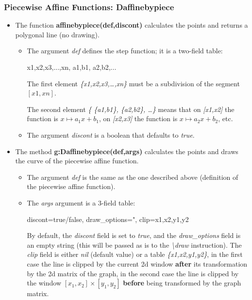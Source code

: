 \subsubsection{Piecewise Affine Functions: Daffinebypiece}

\begin{itemize}
    \item The function \textbf{affinebypiece(def,discont)} calculates the points and returns a polygonal line (no drawing).

\begin{itemize}
    \item The argument \emph{def} defines the step function; it is a two-field table:

\begin{TeXcode}
{ {x1,x2,x3,...,xn}, { {a1,b1}, {a2,b2},...} }
\end{TeXcode}

The first element \emph{\{x1,x2,x3,\ldots,xn\}} must be a subdivision of the segment \([x1,xn]\).

The second element \emph{\{ \{a1,b1\}, \{a2,b2\}, \ldots\}} means that on \emph{{[}x1,x2{]}} the function is \(x\mapsto a_1x+b_1\), on \emph{{[}x2,x3{]}} the function is
\(x\mapsto a_2x+b_2\), etc.

    \item The argument \emph{discont} is a boolean that defaults to \emph{true}.
\end{itemize}

    \item The method \textbf{g:Daffinebypiece(def,args)} calculates the points and draws the curve of the piecewise affine function.

\begin{itemize}
    \item The argument \emph{def} is the same as the one described above (definition of the piecewise affine function).
    \item The \emph{args} argument is a 3-field table:

\begin{TeXcode}
{ discont=true/false, draw_options=", clip={x1,x2,y1,y2} }
\end{TeXcode}

By default, the \emph{discont} field is set to \emph{true}, and the \emph{draw\_options} field is an empty string (this will be passed as is to the \emph{\textbackslash draw} instruction). The \emph{clip} field is either \emph{nil} (default value) or a table \emph{\{x1,x2,y1,y2\}}, in the first case the line is clipped by the current 2d window \textbf{after} its transformation by the 2d matrix of the graph, in the second case the line is clipped by the window $[x_1,x_2]\times[y_1,y_2]$ \textbf{before} being transformed by the graph matrix. \end{itemize}
\end{itemize}

